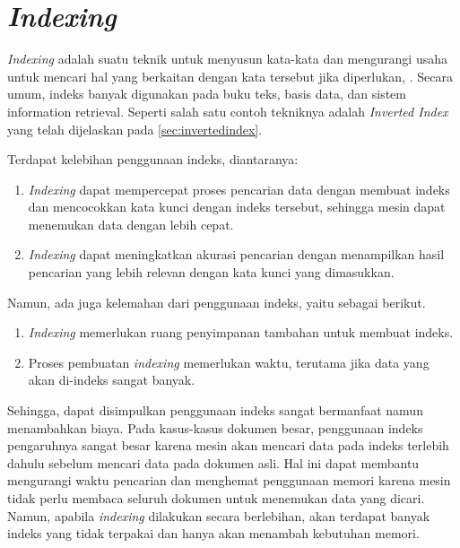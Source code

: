 \section{\textit{Indexing}}
\label{sec:index}

\textit{Indexing} adalah suatu teknik untuk menyusun kata-kata dan mengurangi usaha untuk mencari hal yang berkaitan dengan kata tersebut jika diperlukan, \parencite{database}. Secara umum, indeks banyak digunakan pada buku teks, basis data, dan sistem information retrieval. Seperti salah satu contoh tekniknya adalah \textit{Inverted Index} yang telah dijelaskan pada \ref{sec:invertedindex}.

Terdapat kelebihan penggunaan indeks, diantaranya:
\begin{enumerate}
    \item \textit{Indexing} dapat mempercepat proses pencarian data dengan membuat indeks dan mencocokkan kata kunci dengan indeks tersebut, sehingga mesin dapat menemukan data dengan lebih cepat.
    \item \textit{Indexing} dapat meningkatkan akurasi pencarian dengan menampilkan hasil pencarian yang lebih relevan dengan kata kunci yang dimasukkan.
\end{enumerate}

Namun, ada juga kelemahan dari penggunaan indeks, yaitu sebagai berikut.
\begin{enumerate}
    \item \textit{Indexing} memerlukan ruang penyimpanan tambahan untuk membuat indeks.
    \item Proses pembuatan \textit{indexing} memerlukan waktu, terutama jika data yang akan di-indeks sangat banyak.
\end{enumerate}

Sehingga, dapat disimpulkan penggunaan indeks sangat bermanfaat namun menambahkan biaya.
Pada kasus-kasus dokumen besar, penggunaan indeks pengaruhnya sangat besar karena mesin akan mencari data pada indeks terlebih dahulu sebelum mencari data pada dokumen asli. Hal ini dapat membantu mengurangi waktu pencarian dan menghemat penggunaan memori karena mesin tidak perlu membaca seluruh dokumen untuk menemukan data yang dicari. Namun, apabila \textit{indexing} dilakukan secara berlebihan, akan terdapat banyak indeks yang tidak terpakai dan hanya akan menambah kebutuhan memori.



